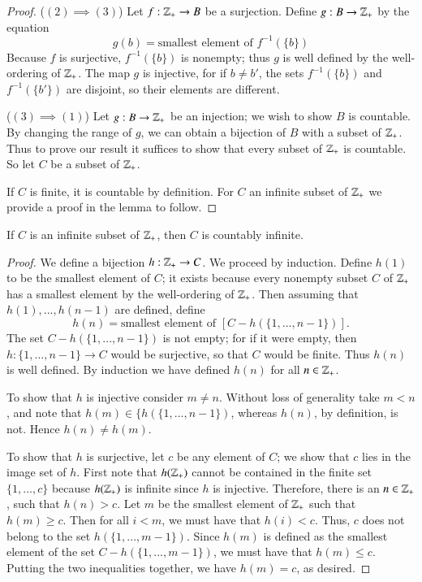 \documentclass[12pt, a4paper, oneside, openright, titlepage]{book}
\begin{document}
\begin{appendices}
\begin{proof}
        ($(2)\implies (3)$) Let $f:\mathbb Z_+\rightarrow B$ be a surjection. Define $g:B\rightarrow \mathbb Z_+$ by the equation \begin{equation*}
            g(b) = \text{smallest element of $f^{-1}(\{b\})$}
        \end{equation*}
        Because $f$ is surjective, $f^{-1}(\{b\})$ is nonempty; thus $g$ is well defined by the well-ordering of $\mathbb Z_+$. The map $g$ is injective, for if $b \neq b'$, the sets $f^{-1}(\{b\})$ and $f^{-1}(\{b'\})$ are disjoint, so their elements are different.

        ($(3)\implies (1)$) Let $g:B\rightarrow \mathbb Z_+$ be an injection; we wish to show $B$ is countable. By changing the range of $g$, we can obtain a bijection of $B$ with a subset of $\mathbb Z_+$. Thus to prove our result it suffices to show that every subset of $\mathbb Z_+$ is countable. So let $C$ be a subset of $\mathbb Z_+$.

        If $C$ is finite, it is countable by definition. For $C$ an infinite subset of $\mathbb Z_+$ we provide a proof in the lemma to follow.
    \end{proof}


    \begin{lem}
        If $C$ is an infinite subset of $\mathbb Z_+$, then $C$ is countably infinite.
    \end{lem}
    \begin{proof}
        We define a bijection $h:\mathbb Z_+\rightarrow C$. We proceed by induction. Define $h(1)$ to be the smallest element of $C$; it exists because every nonempty subset $C$ of $\mathbb Z_+$ has a smallest element by the well-ordering of $\mathbb Z_+$. Then assuming that $h(1),...,h(n-1)$ are defined, define \begin{equation*}
            h(n) = \text{smallest element of } [C-h(\{1,...,n-1\})].
        \end{equation*}
        The set $C-h(\{1,...,n-1\})$ is not empty; for if it were empty, then $h:\{1,...,n-1\}\rightarrow C$ would be surjective, so that $C$ would be finite. Thus $h(n)$ is well defined. By induction we have defined $h(n)$ for all $n \in \mathbb Z_+$.


        To show that $h$ is injective consider $m \neq n$. Without loss of generality take $m < n$, and note that $h(m) \in \{h(\{1,...,n-1\})$, whereas $h(n)$, by definition, is not. Hence $h(n) \neq h(m)$.

        To show that $h$ is surjective, let $c$ be any element of $C$; we show that $c$ lies in the image set of $h$. First note that $h(\mathbb Z_+)$ cannot be contained in the finite set $\{1,...,c\}$ because $h(\mathbb Z_+)$ is infinite since $h$ is injective. Therefore, there is an $n \in \mathbb Z_+$, such that $h(n) > c$. Let $m$ be the smallest element of $\mathbb Z_+$ such that $h(m) \geq c$. Then for all $i < m$, we must have that $h(i) < c$. Thus, $c$ does not belong to the set $h(\{1,...,m-1\})$. Since $h(m)$ is defined as the smallest element of the set $C-h(\{1,...,m-1\})$, we must have that $h(m) \leq c$. Putting the two inequalities together, we have $h(m) = c$, as desired.
    \end{proof}



\end{appendices}
\end{document}
